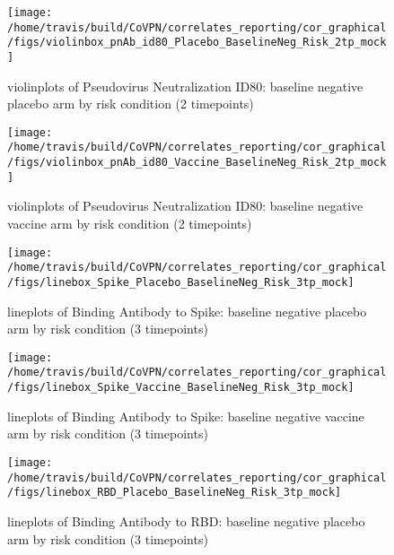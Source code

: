 \documentclass[]{book}
\theoremstyle{definition}
\theoremstyle{definition}
\theoremstyle{definition}
\newcommand{\1}{\mathbbm{1}}
\begin{document}
\clearpage
\begin{figure}[H]

{\centering \texttt{[image: /home/travis/build/CoVPN/correlates\_reporting/cor\_graphical/figs/violinbox\_pnAb\_id80\_Placebo\_BaselineNeg\_Risk\_2tp\_mock]} 

}

\caption{violinplots of Pseudovirus Neutralization ID80: baseline negative placebo arm by risk condition (2 timepoints)}\label{fig:unnamed-chunk-105}
\end{figure}

\clearpage
\begin{figure}[H]

{\centering \texttt{[image: /home/travis/build/CoVPN/correlates\_reporting/cor\_graphical/figs/violinbox\_pnAb\_id80\_Vaccine\_BaselineNeg\_Risk\_2tp\_mock]} 

}

\caption{violinplots of Pseudovirus Neutralization ID80: baseline negative vaccine arm by risk condition (2 timepoints)}\label{fig:unnamed-chunk-106}
\end{figure}

\clearpage
\begin{figure}[H]

{\centering \texttt{[image: /home/travis/build/CoVPN/correlates\_reporting/cor\_graphical/figs/linebox\_Spike\_Placebo\_BaselineNeg\_Risk\_3tp\_mock]} 

}

\caption{lineplots of Binding Antibody to Spike: baseline negative placebo arm by risk condition (3 timepoints)}\label{fig:unnamed-chunk-107}
\end{figure}

\clearpage
\begin{figure}[H]

{\centering \texttt{[image: /home/travis/build/CoVPN/correlates\_reporting/cor\_graphical/figs/linebox\_Spike\_Vaccine\_BaselineNeg\_Risk\_3tp\_mock]} 

}

\caption{lineplots of Binding Antibody to Spike: baseline negative vaccine arm by risk condition (3 timepoints)}\label{fig:unnamed-chunk-108}
\end{figure}

\clearpage
\begin{figure}[H]

{\centering \texttt{[image: /home/travis/build/CoVPN/correlates\_reporting/cor\_graphical/figs/linebox\_RBD\_Placebo\_BaselineNeg\_Risk\_3tp\_mock]} 

}

\caption{lineplots of Binding Antibody to RBD: baseline negative placebo arm by risk condition (3 timepoints)}\label{fig:unnamed-chunk-109}
\end{figure}
\end{document}
